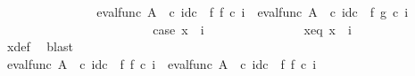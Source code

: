 \begin{isabellebody}
\ \ \ \ \ \ \ \ \ \ \ \ \isamarkupfalse%
\ \isamarkupfalse%
\ {\isachardoublequoteopen}{\isacharparenleft}{\kern0pt}eval{\isacharunderscore}{\kern0pt}func\ A\ {\isasymOmega}\ {\isasymcirc}\isactrlsub c\ id\isactrlsub c\ {\isasymOmega}\ {\isasymtimes}\isactrlsub f\ f{\isacharparenright}{\kern0pt}\ {\isasymcirc}\isactrlsub c\ {\isasymlangle}{\isasymf}{\isacharcomma}{\kern0pt}i{\isasymrangle}\ {\isacharequal}{\kern0pt}\ {\isacharparenleft}{\kern0pt}eval{\isacharunderscore}{\kern0pt}func\ A\ {\isasymOmega}\ {\isasymcirc}\isactrlsub c\ id\isactrlsub c\ {\isasymOmega}\ {\isasymtimes}\isactrlsub f\ g{\isacharparenright}{\kern0pt}\ {\isasymcirc}\isactrlsub c\ {\isasymlangle}{\isasymf}{\isacharcomma}{\kern0pt}i{\isasymrangle}{\isachardoublequoteclose}\isacommand{{\isachardot}{\kern0pt}}\isamarkupfalse%
\isanewline
\ \ \ \ \ \ \ \ \ \ \isamarkupfalse%
\isanewline
\ \ \ \ \ \ \ \ \ \ \ \ \isamarkupfalse%
\ case{}{\isacharcolon}{\kern0pt}\ {\isachardoublequoteopen}x\ {\isasymnoteq}\ {\isasymlangle}{\isasymf}{\isacharcomma}{\kern0pt}i{\isasymrangle}{\isachardoublequoteclose}\isanewline
\ \ \ \ \ \ \ \ \ \ \ \ \isamarkupfalse%
\ \isamarkupfalse%
\ x{\isacharunderscore}{\kern0pt}eq{\isacharcolon}{\kern0pt}\ {\isachardoublequoteopen}x\ {\isacharequal}{\kern0pt}\ {\isasymlangle}{\isasymt}{\isacharcomma}{\kern0pt}i{\isasymrangle}{\isachardoublequoteclose}\isanewline
\ \ \ \ \ \ \ \ \ \ \ \ \ \ \isamarkupfalse%
\ x{\isacharunderscore}{\kern0pt}def{}\ \isamarkupfalse%
\ blast\isanewline
\ \ \ \ \ \ \ \ \ \ \ \ \isamarkupfalse%
\ {\isachardoublequoteopen}{\isacharparenleft}{\kern0pt}eval{\isacharunderscore}{\kern0pt}func\ A\ {\isasymOmega}\ {\isasymcirc}\isactrlsub c\ {\isacharparenleft}{\kern0pt}id\isactrlsub c\ {\isasymOmega}\ {\isasymtimes}\isactrlsub f\ f{\isacharparenright}{\kern0pt}{\isacharparenright}{\kern0pt}\ {\isasymcirc}\isactrlsub c\ {\isasymlangle}{\isasymt}{\isacharcomma}{\kern0pt}i{\isasymrangle}\ {\isacharequal}{\kern0pt}\ eval{\isacharunderscore}{\kern0pt}func\ A\ {\isasymOmega}\ {\isasymcirc}\isactrlsub c\ {\isacharparenleft}{\kern0pt}{\isacharparenleft}{\kern0pt}id\isactrlsub c\ {\isasymOmega}\ {\isasymtimes}\isactrlsub f\ f{\isacharparenright}{\kern0pt}\ {\isasymcirc}\isactrlsub c\ {\isasymlangle}{\isasymt}{\isacharcomma}{\kern0pt}i{\isasymrangle}{\isacharparenright}{\kern0pt}{\isachardoublequoteclose}\isanewline
\ \ \ \ \ \ \ \ \ \ \ \ \ \ \ \ \isamarkupfalse%

\end{isabellebody}

